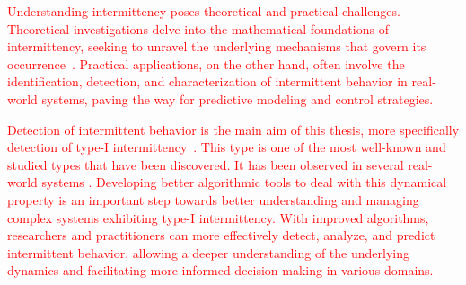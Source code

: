 \par
\textcolor{red}{
Understanding intermittency poses theoretical and practical challenges.
Theoretical investigations delve into the mathematical foundations of intermittency, seeking to unravel the underlying mechanisms that govern its occurrence~\cite{Elaskar2017, Elaskar2023}.
Practical applications, on the other hand, often involve the identification, detection, and characterization of intermittent behavior in real-world systems, paving the way for predictive modeling and control strategies.
}
\par
\textcolor{red}{
Detection of intermittent behavior is the main aim of this thesis, more specifically detection of type-I intermittency~\cite{Pomeau1980,Bussac1982,Elaskar2022,DelRio2014}.
This type is one of the most well-known and studied types that have been discovered.
It has been observed in several real-world systems \cite{Zebrowski2004,Zebrowski2005,Parthimos2001,Aikawa1990,Shiau1995,Storchi2010,Dimitriu2008,Chiriac20070701}.
Developing better algorithmic tools to deal with this dynamical property is an important step towards better understanding and managing complex systems exhibiting type-I intermittency.
With improved algorithms, researchers and practitioners can more effectively detect, analyze, and predict intermittent behavior, allowing a deeper understanding of the underlying dynamics and facilitating more informed decision-making in various domains.
}





